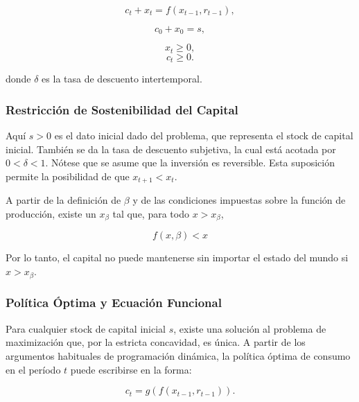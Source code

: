 \documentclass[a4paper,12pt]{article}
\begin{document}
\begin{equation}
	c_t + x_t = f(x_{t-1}, r_{t-1}),
\end{equation}


\begin{equation}
	c_0 + x_0 = s,
\end{equation}

\begin{equation}
	x_t \ge 0,
\end{equation}
\begin{equation}
	c_t \geq 0.
\end{equation}


donde $\delta$ es la tasa de descuento intertemporal.

\subsubsection{Restricción de Sostenibilidad del Capital}

Aquí \( s > 0 \) es el dato inicial dado del problema, que representa el stock de capital inicial. También se da la tasa de descuento subjetiva, la cual está acotada por \( 0 < \delta < 1 \). Nótese que se asume que la inversión es reversible. Esta suposición permite la posibilidad de que \( x_{t+1} < x_t \).

A partir de la definición de \( \beta \) y de las condiciones impuestas sobre la función de producción, existe un \( x_\beta \) tal que, para todo \( x > x_\beta \),

		\begin{equation}
f(x,\beta)<x
		\end{equation}

Por lo tanto, el capital no puede mantenerse sin importar el estado del mundo si \( x > x_\beta \).


\subsubsection{Política Óptima y Ecuación Funcional}

Para cualquier stock de capital inicial \( s \), existe una solución al problema de maximización que, por la estricta concavidad, es única. A partir de los argumentos habituales de programación dinámica, la política óptima de consumo en el período \( t \) puede escribirse en la forma:


\begin{equation}
	c_t = g(f(x_{t-1}, r_{t-1})).
\end{equation}
\end{document}
